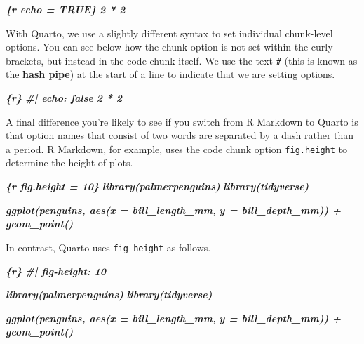 \documentclass[
]{book}
\newenvironment{Shaded}{\begin{snugshade}}{\end{snugshade}}
\newcommand{\InformationTok}[1]{\textcolor[rgb]{0.56,0.35,0.01}{\textbf{\textit{#1}}}}
\begin{document}
\begin{Shaded}
\begin{Highlighting}[]
\InformationTok{\textasciigrave{}\textasciigrave{}\textasciigrave{}\{r echo = TRUE\}}
\InformationTok{2 * 2}
\InformationTok{\textasciigrave{}\textasciigrave{}\textasciigrave{}}
\end{Highlighting}
\end{Shaded}

With Quarto, we use a slightly different syntax to set individual chunk-level options. You can see below how the chunk option is not set within the curly brackets, but instead in the code chunk itself. We use the text \texttt{\#\textbar{}} (this is known as the \textbf{hash pipe}) at the start of a line to indicate that we are setting options.

\begin{Shaded}
\begin{Highlighting}[]
\InformationTok{\textasciigrave{}\textasciigrave{}\textasciigrave{}\{r\}}
\InformationTok{\#| echo: false}
\InformationTok{2 * 2}
\InformationTok{\textasciigrave{}\textasciigrave{}\textasciigrave{}}
\end{Highlighting}
\end{Shaded}

A final difference you're likely to see if you switch from R Markdown to Quarto is that option names that consist of two words are separated by a dash rather than a period. R Markdown, for example, uses the code chunk option \texttt{fig.height} to determine the height of plots.

\begin{Shaded}
\begin{Highlighting}[]
\InformationTok{\textasciigrave{}\textasciigrave{}\textasciigrave{}\{r fig.height = 10\}}
\InformationTok{library(palmerpenguins)}
\InformationTok{library(tidyverse)}

\InformationTok{ggplot(penguins, aes(x = bill\_length\_mm,}
\InformationTok{                     y = bill\_depth\_mm)) +}
\InformationTok{  geom\_point()}
\InformationTok{\textasciigrave{}\textasciigrave{}\textasciigrave{}}
\end{Highlighting}
\end{Shaded}

In contrast, Quarto uses \texttt{fig-height} as follows.

\begin{Shaded}
\begin{Highlighting}[]
\InformationTok{\textasciigrave{}\textasciigrave{}\textasciigrave{}\{r\}}
\InformationTok{\#| fig{-}height: 10}

\InformationTok{library(palmerpenguins)}
\InformationTok{library(tidyverse)}

\InformationTok{ggplot(penguins, aes(x = bill\_length\_mm,}
\InformationTok{                     y = bill\_depth\_mm)) +}
\InformationTok{  geom\_point()}
\InformationTok{\textasciigrave{}\textasciigrave{}\textasciigrave{}}
\end{Highlighting}
\end{Shaded}
\end{document}
